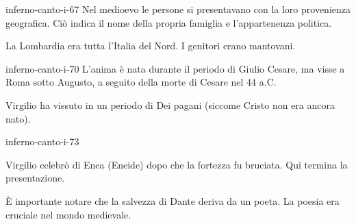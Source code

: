 \documentclass[preview]{standalone}
\begin{document}
\begin{snippet}{inferno-canto-i-67}
    Nel medioevo le persone si presentavano con la loro provenienza geografica.
    Ciò indica il nome della propria famiglia e l'appartenenza politica.
    
    La Lombardia era tutta l'Italia del Nord.
    I genitori erano mantovani.
\end{snippet}

\begin{snippet}{inferno-canto-i-70}
    L'anima è nata durante il periodo di Giulio Cesare, ma visse
    a Roma sotto Augusto, a seguito della morte di Cesare nel 44 a.C.
    
    Virgilio ha vissuto in un periodo di Dei pagani (siccome Cristo non era ancora nato).
\end{snippet}

\begin{snippet}{inferno-canto-i-73}

    Virgilio celebrò di Enea (Eneide) dopo che la fortezza fu bruciata.
    Qui termina la presentazione.
    
    È importante notare che la salvezza di Dante deriva da un poeta.
    La poesia era cruciale nel mondo medievale.
\end{snippet}
\end{document}
